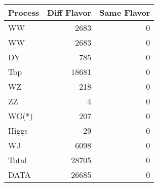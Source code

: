 \begin{table}[ht]
	\centering
\begin{tabular}{lrr}

Process &  Diff Flavor &  Same Flavor \\
		\hline
     WW &         2683 &            0 \\
     WW &         2683 &            0 \\
     DY &          785 &            0 \\
    Top &        18681 &            0 \\
     WZ &          218 &            0 \\
     ZZ &            4 &            0 \\
  WG(*) &          207 &            0 \\
  Higgs &           29 &            0 \\
     WJ &         6098 &            0 \\
\hline
  Total &        28705 &            0 \\
   DATA &        26685 &            0 \\


\end{tabular}

\end{table}